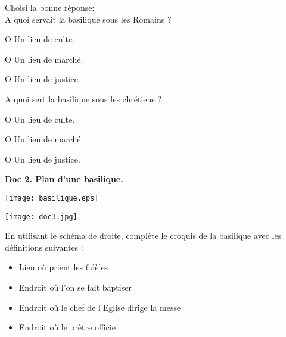 \documentclass[12pt]{article}
\begin{document}
 \begin{minipage}{7cm}
Choisi la bonne réponse: \\
A quoi servait la basilique sous les Romains ? \\
\begin{minipage}{5cm}
O Un lieu de culte.
\end{minipage}
\begin{minipage}{5cm}
O Un lieu de marché.
\end{minipage}
\begin{minipage}{5cm}
O Un lieu de justice. \\
\end{minipage}

\vspace{0.5cm}

A quoi sert la basilique sous les chrétiens ? \\
\begin{minipage}{5cm}
O Un lieu de culte.
\end{minipage}
\begin{minipage}{5cm}
O Un lieu de marché.
\end{minipage}
\begin{minipage}{5cm}
O Un lieu de justice.
\end{minipage}
\end{minipage}

\textbf{Doc 2. Plan d'une basilique.}\\
\begin{minipage}{11cm}

\texttt{[image: basilique.eps]}
\end{minipage}
\begin{minipage}{7cm}
\texttt{[image: doc3.jpg]}
\end{minipage}

\vspace{1cm}
En utilisant le schéma de droite, complète le croquis de la basilique avec les définitions suivantes : 
\begin{itemize}
\item Lieu où prient les fidèles
\item Endroit où l'on se fait baptiser
\item Endroit où le chef de l'Eglise dirige la messe
\item Endroit où le prêtre officie
\end{itemize}
\end{document}

